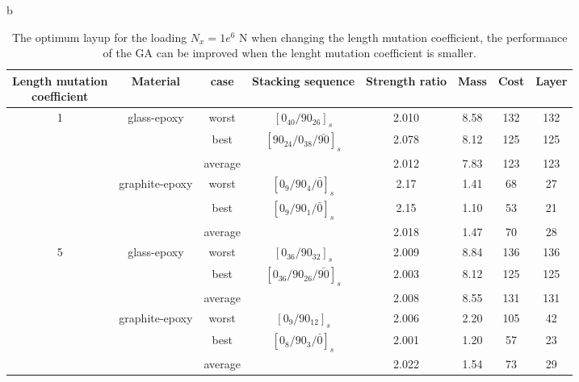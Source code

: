 \documentclass[10pt, journal]{IEEEtran}
\begin{document}
\begin{table}{b}
\caption{The optimum layup for the loading $N_x=1e^6$ N when changing the
length mutation coefficient, the performance of the GA can be improved
when the lenght mutation coefficient is smaller.} \centering
\begin{adjustbox}{width=0.5\textwidth}
	\begin{tabular}{cccccccc}
	\toprule
	\makecell{Length mutation \\ coefficient}		     &	 Material		               	 & case     & Stacking sequence    & Strength ratio  & Mass  &  Cost   & Layer    \\ 
	\midrule																															  
	\multirow{6}{*}{1} &	\multirow{3}{*}{glass-epoxy}   	 & worst     &  $[0_{40}/90_{26}]_s$ & 2.010           &  8.58  & 132     & 132   \\
					   &								     & best      &  $[90_{24}/0_{38}/\bar{90}]_s$ & 2.078  &  8.12  & 125     & 125  \\
					     &									 & average   &    		           & 2.012           &  7.83  & 123     & 123  \\
						 &	\multirow{3}{*}{graphite-epoxy}	 & worst     &  $[0_{9}/90_{4}/\bar{0}]_s$ & 2.17             & 1.41   & 68      & 27      \\
					     &								     & best      &  $[0_{9}/90_{1}/\bar{0}]_s$  & 2.15           & 1.10   & 53      & 21      \\
					     &								     & average   &                     & 2.018           & 1.47   & 70      & 28      \\ 
	\multirow{6}{*}{5} &	\multirow{3}{*}{glass-epoxy}   	 & worst     &  $[0_{36}/90_{32}]_s$ &  2.009          & 8.84   &  136    &  136   \\
					   &								     & best      &  $[0_{36}/90_{26}/\bar{90}]_s$ &  2.003          & 8.12   &  125    &  125   \\
					     &									 & average   &                     &  2.008          & 8.55   &  131    &  131  \\
						 &	\multirow{3}{*}{graphite-epoxy}	 & worst     &  $[0_{9}/90_{12}]_s$ &  2.006          & 2.20   &  105    &  42  \\
						 &								     & best      &  $[0_{8}/90_{3}/\bar{0}]_s$  &  2.001          & 1.20   &  57     &  23  \\
					     &								     & average   &                    &   2.022          & 1.54   &  73     &  29  \\
	\bottomrule																															  
\end{tabular}
\end{adjustbox}
\label{tab:optimum_layup}
\end{table}
\end{document}
